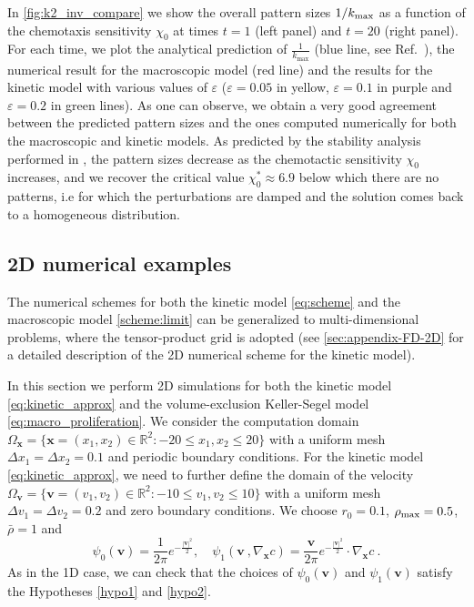 \documentclass[review,onefignum,onetabnum]{siamart220329}
\newcommand {\e}  {\varepsilon}
\begin{document}
In \cref{fig:k2_inv_compare} we show the overall pattern sizes $1/k_{\rm max}$ as a function of the chemotaxis sensitivity $\chi_0$ 
at times $t=1$ (left panel) and $t=20$ (right panel). For each time, we plot the analytical prediction of $\frac{1}{k_{\max}}$ (blue line, see Ref.~\cite{almeida2020treatment}), the numerical result for the macroscopic model (red line) and the results for the kinetic model with various values of $\e$ ($\e = 0.05$ in yellow, $\e = 0.1$ in purple and $\e = 0.2$ in green lines). 
As one can observe, we obtain a very good agreement between the predicted pattern sizes and the ones computed numerically for both the macroscopic and kinetic models. 
As predicted by the stability analysis performed in \cite{almeida2020treatment}, the pattern sizes decrease as the chemotactic sensitivity $\chi_0$ increases, and we recover the critical value $\chi_0^* \approx 6.9$ below which there are no patterns, i.e for which the perturbations are damped and the solution comes back to a homogeneous distribution. 


\subsection{2D numerical examples}
The numerical schemes for both the kinetic model \cref{eq:scheme} and the macroscopic model \cref{scheme:limit} can be generalized to multi-dimensional problems, where the tensor-product grid is adopted {(see \cref{sec:appendix-FD-2D} for a detailed description of the 2D numerical scheme for the kinetic model)}. 

In this section we perform 2D simulations for both  {{the kinetic model \cref{eq:kinetic_approx}}} and  {{the volume-exclusion Keller-Segel model \cref{eq:macro_proliferation}}}. 
We consider the computation domain $\Omega_\mathbf{x} = \{\mathbf{x} = (x_1,x_2)\in\mathbb{R}^2: -20\le x_1, x_2 \le 20\}$ with a uniform mesh $\Delta x_1 = \Delta x_2 = 0.1$ and periodic boundary conditions.  
For the kinetic model \cref{eq:kinetic_approx}, we need to further define the domain of the velocity $\Omega_\mathbf{v} = \{\mathbf{v} = (v_1,v_2)\in\mathbb{R}^2: -10\le v_1, v_2 \le 10\}$ with a uniform mesh $\Delta v_1 = \Delta v_2 = 0.2$ and zero boundary conditions. 
We choose $r_0=0.1$, $\rho_{\rm max} = 0.5$, $\bar{\rho} = 1$ and 
\begin{equation*}
    \psi_0(\mathbf{v}) = \frac{1}{2\pi} e^{-\frac{|\mathbf{v}|^2}{2}}, \quad \psi_1(\mathbf{v}\ , \nabla_\mathbf{x} c) = \frac{\mathbf{v}}{2\pi} e^{-\frac{|\mathbf{v}|^2}{2}}\cdot \nabla_\mathbf{x} c\ .
\end{equation*}
As in the 1D case, we can check that the choices of $\psi_0(\mathbf{v})$ and $\psi_1(\mathbf{v})$ satisfy the Hypotheses \cref{hypo1} and \cref{hypo2}.
\end{document}
